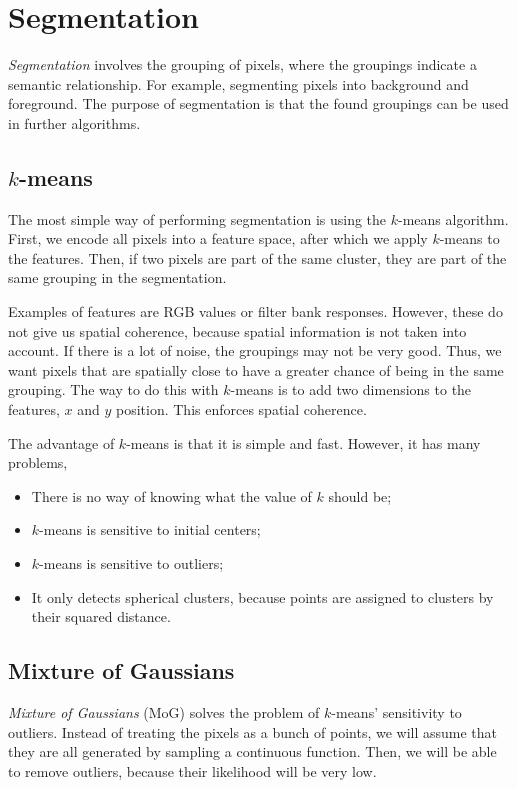 \section{Segmentation}

\textit{Segmentation} involves the grouping of pixels, where the groupings
indicate a semantic relationship. For example, segmenting pixels into
background and foreground. The purpose of segmentation is that the found
groupings can be used in further algorithms.

\subsection{$k$-means}

The most simple way of performing segmentation is using the $k$-means
algorithm. First, we encode all pixels into a feature space, after which we
apply $k$-means to the features. Then, if two pixels are part of the same
cluster, they are part of the same grouping in the segmentation.

Examples of features are RGB values or filter bank responses. However, these do not give us spatial
coherence, because spatial information is not taken into account. If there is
a lot of noise, the groupings may not be very good. Thus, we want pixels that
are spatially close to have a greater chance of being in the same grouping.
The way to do this with $k$-means is to add two dimensions to the features,
$x$ and $y$ position. This enforces spatial coherence.

The advantage of $k$-means is that it is simple and fast. However, it has
many problems,
\begin{itemize}
    \item There is no way of knowing what the value of $k$ should be;
    \item $k$-means is sensitive to initial centers;
    \item $k$-means is sensitive to outliers;
    \item It only detects spherical clusters, because points are assigned to
          clusters by their squared distance.
\end{itemize}

\subsection{Mixture of Gaussians}

\textit{Mixture of Gaussians} (MoG) solves the problem of $k$-means'
sensitivity to outliers. Instead of treating the pixels as a bunch of points,
we will assume that they are all generated by sampling a continuous function.
Then, we will be able to remove outliers, because their likelihood will be very
low.

